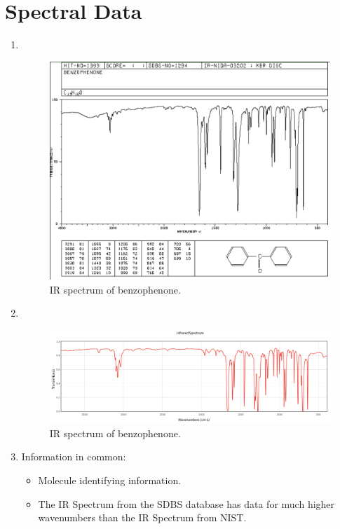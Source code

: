 \documentclass[titlepage]{article}
\begin{document}
\section*{Spectral Data}
\begin{enumerate}
    \item ${\color{white}hi}$
    \begin{figure}[H]
        \centering
        \includegraphics[width=0.8\linewidth]{../../ExtFiles/Benzophenone-IRSpectrum.png}
        \caption{IR spectrum of benzophenone\supercite{bib:Benzophenone-IRSpectrum}.}
        \label{fig:IRSpectrum}
    \end{figure}
    \pagebreak
    \item ${\color{white}hi}$
    \begin{figure}[H]
        \centering
        \includegraphics[width=0.8\linewidth]{../../ExtFiles/Benzophenone-IRSpectrum2.png}
        \caption{IR spectrum of benzophenone\supercite{bib:Benzophenone-IRSpectrum2}.}
        \label{fig:IRSpectrum2}
    \end{figure}
    \item Information in common:
    \begin{itemize}
        \item Molecule identifying information.
        \item The IR Spectrum from the SDBS database has data for much higher wavenumbers than the IR Spectrum from NIST.

\end{itemize}
\end{enumerate}
\end{document}
